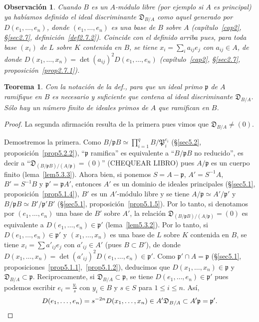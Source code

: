 \documentclass[oneside,bibtotoc,leqno,spanish]{amsbook}
\newcommand{\idl}[1]{\mathfrak{#1}}
\newcommand{\disc}{\mathfrak{D}}
\numberwithin{equation}{section}
\theoremstyle{defi}
\theoremstyle{note}
\newtheorem{theorem}{Teorema}
\theoremstyle{rem}
\newtheorem{remark}{Observaci\'on}
\numberwithin{theorem}{section}
\numberwithin{proposition}{section}
\numberwithin{definition}{section}
\numberwithin{lemma}{section}
\numberwithin{corollary}{section}
\numberwithin{example}{section}
\numberwithin{footnote}{section}%
\begin{document}
\begin{remark}
Cuando $B$ es un $A$-m\'odulo {\em libre} (por ejemplo si $A$ es principal)
ya hab\'iamos definido el ideal discriminante $\disc_{B/A}$ como aquel generado por $D(e_{1},\dots,e_{n})$,
donde $(e_{1},\dots,e_{n})$ es una base de $B$ sobre $A$ (cap\'itulo~\ref{cap2}, \S\ref{sec2.7}, definici\'on~\ref{def2.7.2}). Coincide
con el definido arriba pues, para toda base $(x_{i})$ de $L$ sobre $K$ contenida en $B$, se tiene
$x_{i} = \sum_{i}a_{ij}e_{j}$ con $a_{ij}\in A$, de donde
$D(x_{1},\dots,x_{n}) = \det(a_{ij})^{2}D(e_{1},\dots,e_{n})$
(cap\'itulo~\ref{cap2}, \S\ref{sec2.7}, proposici\'on~\ref{prop2.7.1}).
\end{remark}

\begin{theorem}\label{teo5.3.1}
Con la notaci\'on de la def., para que un ideal primo $\idl{p}$ de $A$ ramifique en $B$ es necesario y
suficiente que contena al ideal discriminante $\disc_{B/A}$. S\'olo hay un n\'umero finito de
ideales primos de $A$ que ramifican en $B$.
\end{theorem}

\begin{proof}
La segunda afirmaci\'on resulta de la primera pues vimos que $\disc_{B/A}\neq(0)$.

Demostremos la primera. Como $B/\idl{p}B\simeq\prod_{i=1}^{q}B/\idl{P}_{i}^{e_{i}}$ (\S\ref{sec5.2}, proposici\'on~\ref{prop5.2.2}),
``$\idl{p}$ ramifica'' es equivalente a ``$B/\idl{p}B$ no reducido'', es decir a
``$\disc_{(B/\idl{p}B)/(A/\idl{p})}=(0)$'' (CHEQUEAR LIBRO) pues $A/\idl{p}$ es un cuerpo finito (lema~\ref{lem5.3.3}). Ahora bien,
si ponemos $S = A-\idl{p}$, $A' = S^{-1}A$, $B' =S^{-1}B$ y $\idl{p}' = \idl{p}A'$, entonces
$A'$ es un dominio de ideales principales (\S\ref{sec5.1}, proposici\'on~\ref{prop5.1.4}),
$B'$ es un $A'$-m\'odulo libre y se
tiene $A/\idl{p}\simeq A'/\idl{p}'$ y $B/\idl{p}B\simeq B'/\idl{p}'B'$
(\S\ref{sec5.1}, proposici\'on~\ref{prop5.1.5}). Por lo tanto, si denotamos por $(e_{1},\dots,e_{n})$ una base de $B'$ sobre $A'$, la
relaci\'on $\disc_{(B/\idl{p}B)/(A/\idl{p})}=(0)$ es equivalente a $D(e_{1},\dots,e_{n})\in\idl{p}'$
(lema~\ref{lem5.3.2}). Por lo tanto, si $D(e_{1},\dots,e_{n})\in\idl{p}'$ y $(x_{1},\dots,x_{n})$ es una base de $L$
sobre $K$ contenida en $B$, se tiene $x_{i} = \sum a'_{ij}e_{j}$ con $a'_{ij}\in A'$
(pues $B\subset B'$), de donde $D(x_{1},\dots,x_{n})=\det(a'_{ij})^{2}D(e_{1},\dots,e_{n})\in\idl{p}'$.
Como $\idl{p}'\cap A = \idl{p}$ (\S\ref{sec5.1}, proposiciones~\ref{prop5.1.1},~\ref{prop5.1.2}),
deducimos que $D(x_{1},\dots,x_{n})\in\idl{p}$ y
$\disc_{B/A}\subset\idl{p}$. Reciprocamente, si $\disc_{B/A}\subset\idl{p}$, se tiene
$D(e_{1},\dots,e_{n})\in\idl{p}'$ pues podemos escribir $e_{i}=\frac{y_{i}}{s}$ con $y_{i}\in B$
y $s\in S$ para $1\leq i\leq n$. As\'i,
\begin{gather*}
D(e_{1},\dots,e_{n}) = s^{-2n}D(x_{1},\dots,x_{n})\in A'\disc_{B/A}\subset A'\idl{p}=\idl{p}'.\qedhere
\end{gather*}
\end{proof}
\end{document}
